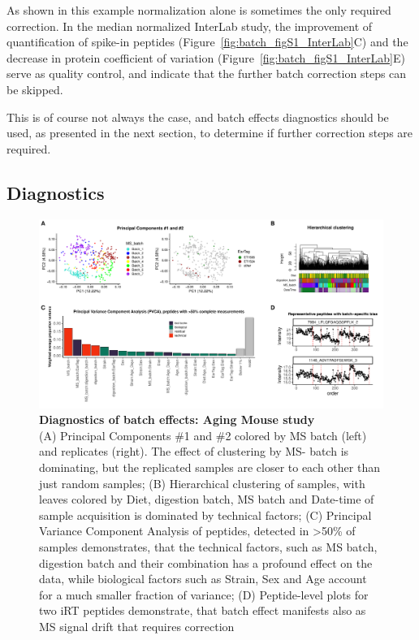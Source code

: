 \documentclass[num-refs]{wiley-article}
\begin{document}
As shown in this example normalization alone is sometimes the only required correction. In the median normalized InterLab study, the improvement of quantification of spike-in peptides (Figure~\ref{fig:batch_figS1_InterLab}C) and the decrease in protein coefficient of variation (Figure~\ref{fig:batch_figS1_InterLab}E) serve as quality control, and indicate that the further batch correction steps can be skipped.

This is of course not always the case, and batch effects diagnostics should be used, as presented in the next section, to determine if further correction steps are required.


\subsection{Diagnostics}

\begin{figure}[hbt]
	\includegraphics[width=\textwidth]{figures/Fig3_diagnostics1.pdf}
	\caption{\textbf{Diagnostics of batch effects: Aging Mouse study}  \\
		\footnotesize
		(A) Principal Components \#1 and \#2 colored by MS batch (left) and replicates (right). The effect of clustering by MS- batch is dominating, but the replicated samples are closer to each other than just random samples; (B) Hierarchical clustering of samples, with leaves colored by Diet, digestion batch, MS batch and Date-time of sample acquisition is dominated by technical factors; (C) Principal Variance Component Analysis of peptides, detected in >50\% of samples demonstrates, that the technical factors, such as MS batch, digestion batch and their combination has a profound effect on the data, while biological factors such as Strain, Sex and Age account for a much smaller fraction of variance; (D) Peptide-level plots for two iRT peptides demonstrate, that batch effect manifests also as MS signal drift that requires correction}
	\label{fig:batch_fig3_diagnostics}
\end{figure}
\end{document}
